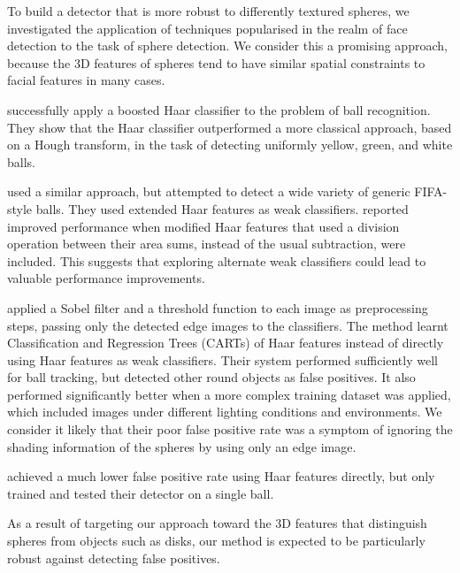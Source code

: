 \documentclass{llncs}
\begin{document}
{		To build a detector that is more robust to differently textured spheres, we investigated the application of techniques popularised in the realm of face detection to the task of sphere detection. We consider this a promising approach, because the 3D features of spheres tend to have similar spatial constraints to facial features in many cases.


		\citet{masselli2013haar} successfully apply a boosted Haar classifier \citep{viola2001robust} to the problem of ball recognition. They show that the Haar classifier outperformed a more classical approach, based on a Hough transform, in the task of detecting uniformly yellow, green, and white balls.

		\citet{zhang2013novel} used a similar approach, but attempted to detect a wide variety of generic FIFA-style balls. They used extended Haar features \citep{Lienhart2002extended} as weak classifiers. \citet{zhang2013novel} reported improved performance when modified Haar features that used a division operation between their area sums, instead of the usual subtraction, were included. This suggests that exploring alternate weak classifiers could lead to valuable performance improvements.

		\citet{mitri2004fast} applied a Sobel filter and a threshold function to each image as preprocessing steps, passing only the detected edge images to the classifiers. The method learnt Classification and Regression Trees (CARTs) of Haar features instead of directly using Haar features as weak classifiers. Their system performed sufficiently well for ball tracking, but detected other round objects as false positives. It also performed significantly better when a more complex training dataset was applied, which included images under different lighting conditions and environments. We consider it likely that their poor false positive rate was a symptom of ignoring the shading information of the spheres by using only an edge image.

		\citet{treptow2004filter} achieved a much lower false positive rate using Haar features directly, but only trained and tested their detector on a single ball.

		As a result of targeting our approach toward the 3D features that distinguish spheres from objects such as disks, our method is expected to be particularly robust against detecting false positives.

	}
\end{document}
